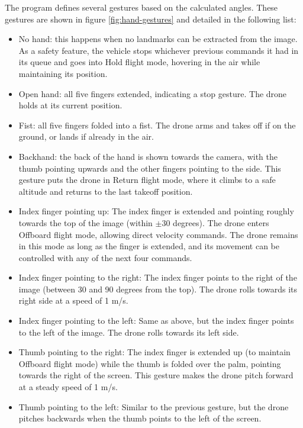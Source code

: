 The program defines several gestures based on the calculated angles. These gestures are shown in figure \ref{fig:hand-gestures} and detailed in the following list:
\begin{itemize}
    \item No hand: this happens when no landmarks can be extracted from the image. As a safety feature, the vehicle stops whichever previous commands it had in its queue and goes into Hold flight mode, hovering in the air while maintaining its position.
    \item Open hand: all five fingers extended, indicating a stop gesture. The drone holds at its current position.
    \item Fist: all five fingers folded into a fist. The drone arms and takes off if on the ground, or lands if already in the air.
    \item Backhand: the back of the hand is shown towards the camera, with the thumb pointing upwards and the other fingers pointing to the side. This gesture puts the drone in Return flight mode, where it climbs to a safe altitude and returns to the last takeoff position.
    \item Index finger pointing up: The index finger is extended and pointing roughly towards the top of the image (within $\pm$30 degrees). The drone enters Offboard flight mode, allowing direct velocity commands. The drone remains in this mode as long as the finger is extended, and its movement can be controlled with any of the next four commands.
    \item Index finger pointing to the right: The index finger points to the right of the image (between 30 and 90 degrees from the top). The drone rolls towards its right side at a speed of 1 m/s.
    \item Index finger pointing to the left: Same as above, but the index finger points to the left of the image. The drone rolls towards its left side.
    \item Thumb pointing to the right: The index finger is extended up (to maintain Offboard flight mode) while the thumb is folded over the palm, pointing towards the right of the screen. This gesture makes the drone pitch forward at a steady speed of 1 m/s.
    \item Thumb pointing to the left: Similar to the previous gesture, but the drone pitches backwards when the thumb points to the left of the screen.
\end{itemize}

